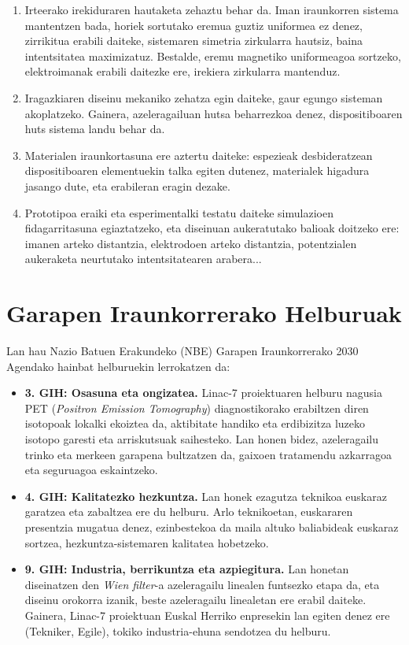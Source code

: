 \documentclass[12pt]{article}
\numberwithin{figure}{section}
\numberwithin{equation}{section}
\begin{document}
\begin{enumerate}
    \item Irteerako irekiduraren hautaketa zehaztu behar da. Iman iraunkorren sistema mantentzen bada, horiek sortutako eremua guztiz uniformea ez denez, zirrikitua erabili daiteke, sistemaren simetria zirkularra hautsiz, baina intentsitatea maximizatuz. Bestalde, eremu magnetiko uniformeagoa sortzeko, elektroimanak erabili daitezke ere, irekiera zirkularra mantenduz.
    \item Iragazkiaren diseinu mekaniko zehatza egin daiteke, gaur egungo sisteman akoplatzeko. Gainera, azeleragailuan hutsa beharrezkoa denez, dispositiboaren huts sistema landu behar da.
    \item Materialen iraunkortasuna ere aztertu daiteke: espezieak desbideratzean dispositiboaren elementuekin talka egiten dutenez, materialek higadura jasango dute, eta erabileran eragin dezake.
    \item Prototipoa eraiki eta esperimentalki testatu daiteke simulazioen fidagarritasuna egiaztatzeko, eta diseinuan aukeratutako balioak doitzeko ere: imanen arteko distantzia, elektrodoen arteko distantzia, potentzialen aukeraketa neurtutako intentsitatearen arabera...
\end{enumerate}



\section{Garapen Iraunkorrerako Helburuak}
Lan hau Nazio Batuen Erakundeko (NBE) Garapen Iraunkorrerako 2030 Agendako hainbat helburuekin lerrokatzen da:\\

\begin{itemize}
    \item \textbf{3. GIH: Osasuna eta ongizatea.} Linac-7 proiektuaren helburu nagusia PET (\textit{Positron Emission Tomography}) diagnostikorako erabiltzen diren isotopoak lokalki ekoiztea da, aktibitate handiko eta erdibizitza luzeko isotopo garesti eta arriskutsuak saihesteko. Lan honen bidez, azeleragailu trinko eta merkeen garapena bultzatzen da, gaixoen tratamendu azkarragoa eta seguruagoa eskaintzeko.
    \item \textbf{4. GIH: Kalitatezko hezkuntza.} Lan honek ezagutza teknikoa euskaraz garatzea eta zabaltzea ere du helburu. Arlo teknikoetan, euskararen presentzia mugatua denez, ezinbestekoa da maila altuko baliabideak euskaraz sortzea, hezkuntza-sistemaren kalitatea hobetzeko.
    \item \textbf{9. GIH: Industria, berrikuntza eta azpiegitura.} Lan honetan diseinatzen den \textit{Wien filter}-a azeleragailu linealen funtsezko etapa da, eta diseinu orokorra izanik, beste azeleragailu linealetan ere erabil daiteke. Gainera, Linac-7 proiektuan Euskal Herriko enpresekin lan egiten denez ere (Tekniker, Egile), tokiko industria-ehuna sendotzea du helburu.
\end{itemize}
\newpage
\printbibliography
\end{document}
